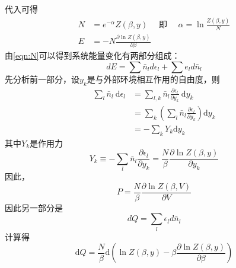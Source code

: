 \documentclass[12pt, a4paper, oneside]{ctexbook}
\newcommand{\hl}[1]{\hlbox{#1}}
\newcounter{#2}
\newcounter{#2}[#1]
\numberwithin{#2}{#1}
\begin{document}
          \begin{deduce}
            代入可得
            \begin{align}
                N & =e^{-\alpha} Z(\beta, y) \quad \text { 即 } \quad \alpha=\ln \frac{Z(\beta, y)}{N} \\
                E & =-N \frac{\partial \ln Z(\beta, y)}{\partial \beta}
            \end{align}
            由\autoref{eqn:N}可以得到系统能量变化有两部分组成：
            \begin{equation}
              dE=\sum \bar n_ld\epsilon_l+\sum e_ld\bar n_l
            \end{equation}
            先分析前一部分，设\(y_k\)是与外部环境相互作用的自由度，则
            \begin{equation}
              \begin{aligned}
                \sum_l \bar{n}_l \mathrm{~d} \epsilon_l & =\sum_{l, k} \bar{n}_l \frac{\partial \epsilon_l}{\partial y_k} \mathrm{~d} y_k \\
                & =\sum_k\left(\sum_l \bar{n}_l \frac{\partial \epsilon_l}{\partial y_k}\right) \mathrm{d} y_k\\
                &=-\sum_k Y_k \mathrm{d} y_k
                \end{aligned}
            \end{equation}
            其中\(Y_k\)是作用力
            \begin{equation}
              Y_k \equiv-\sum_l \bar{n}_l \frac{\partial \epsilon_l}{\partial y_k}=\frac{N}{\beta} \frac{\partial \ln Z(\beta, y)}{\partial y_k}
            \end{equation}
            因此，\hl{压力}
            \begin{equation}
              P=\frac{N}{\beta} \frac{\partial \ln Z(\beta, V)}{\partial V}
            \end{equation}
            因此另一部分是\hl{热量}
            \begin{equation}
              dQ=\sum_l \epsilon_ld\bar n_l
            \end{equation}
            计算得
            \begin{equation}
              \mathrm{d} Q=\frac{N}{\beta} \mathrm{d}\left(\ln Z(\beta, y)-\beta \frac{\partial \ln Z(\beta, y)}{\partial \beta}\right)
            \end{equation}
          \end{deduce}
\end{document}
